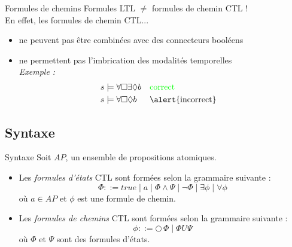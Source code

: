 \documentclass[compress]{beamer}
\begin{document}
\begin{frame}{Formules de chemins}
  Formules LTL $\neq$ formules de chemin CTL ! \\
  En effet, les formules de chemin CTL...
  \begin{itemize}
    \item ne peuvent pas être combinées avec des connecteurs booléens
    \item ne permettent pas l'imbrication des modalités temporelles \\
    \textit{\color{gray}Exemple : }\\
    \begin{align*}
      &s \models \forall \Box\exists\Diamond b && \text{\color{green}correct}& \\
      &s \models \forall \Box\Diamond b && \text{\alert{incorrect}}&
    \end{align*}
  \end{itemize}
\end{frame}

\subsection{Syntaxe}
\begin{frame}
  \begin{block}{Syntaxe}
    Soit $AP$, un ensemble de propositions atomiques.
    \begin{itemize}
      \item Les \textit{\color{fibeamer@orange}formules d'états} CTL sont formées selon la
    grammaire suivante :
    \[
      \Phi ::= true \; | \; a \; | \; \Phi \wedge \Psi \; | \; \neg \Phi \; | \; \exists \phi \; | \; \forall \phi
    \]
    où $a \in AP$ et $\phi$ est une formule de chemin.
      \item Les \textit{\color{fibeamer@orange}formules de chemins} CTL sont formées selon la grammaire suivante :
      \[
        \phi ::= \bigcirc\,\Phi \; | \; \Phi U \Psi
      \]
      où $\Phi$ et $\Psi$ sont des formules d'états.
    \end{itemize}
  \end{block}
\end{frame}
\end{document}

